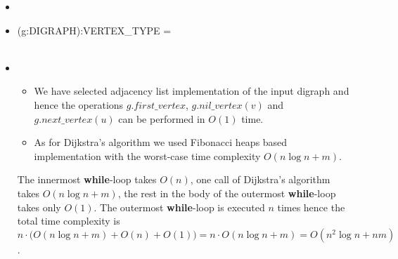 \documentclass[english]{article}
\begin{document}
\begin{itemize}
\item

\item
\begin{algorithmic}
 (g:DIGRAPH):VERTEX\_TYPE =\\
\\
  \ENDWHILE
  \ENDIF
\ENDWHILE
{}
\end{algorithmic}

\item
  \begin{itemize}
     \item We have selected adjacency list implementation of the input digraph
      and hence the operations $g.first\_vertex$, $g.nil\_vertex(v)$ and
      $g.next\_vertex(u)$ can be performed in $O(1)$ time.
 \item As for Dijkstra's algorithm we used Fibonacci heaps based 
 implementation with the worst-case time complexity $O(n\log n +m)$.
  \end{itemize}
  The innermost {\bf while}-loop takes $O(n)$, one call of Dijkstra's algorithm
 takes $O(n\log n +m)$, the rest in the body of the outermost {\bf while}-loop 
 takes only $O(1)$.
 The  outermost {\bf while}-loop is executed $n$ times hence the total 
 time complexity is  $n \cdot \big(O(n \log n + m)+ O(n) +O(1)\big) = 
n\cdot O(n \log n + m) = O(n^2 \log n+ nm)$.
\end{itemize}
\end{document}
